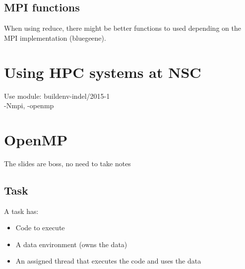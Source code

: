\documentclass[a4paper]{article}
\begin{document}
\subsection{MPI functions}
When using reduce, there might be better functions to used depending on the
MPI implementation (bluegeene).
\section{Using HPC systems at NSC}
Use module: buildenv-indel/2015-1
\\-Nmpi, -openmp\\
\section{OpenMP}
The slides are boss, no need to take notes
\subsection{Task}
A task has:
\begin{itemize}
    \item Code to execute
    \item A data environment (owns the data)
    \item An assigned thread that executes the code and uses the data
\end{itemize}
\end{document}

